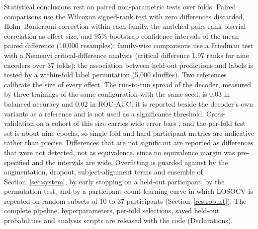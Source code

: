Statistical conclusions rest on paired non-parametric tests over folds. Paired comparisons use the Wilcoxon signed-rank test with zero differences discarded, Holm--Bonferroni correction within each family, the matched-pairs rank-biserial correlation as effect size, and 95\% bootstrap confidence intervals of the mean paired difference (10{,}000 resamples); family-wise comparisons use a Friedman test with a Nemenyi critical-difference analysis (critical difference 1.97 ranks for nine encoders over 37 folds); the association between held-out predictions and labels is tested by a within-fold label permutation (5{,}000 shuffles). Two references calibrate the size of every effect. The run-to-run spread of the decoder, measured by three trainings of the same configuration with the same seed, is 0.03 in balanced accuracy and 0.02 in ROC-AUC; it is reported beside the decoder's own variants as a reference and is not used as a significance threshold. Cross-validation on a cohort of this size carries wide error bars \cite{ref63}, and the per-fold test set is about nine epochs, so single-fold and hard-participant metrics are indicative rather than precise. Differences that are not significant are reported as differences that were not detected, not as equivalence, since no equivalence margin was pre-specified and the intervals are wide. Overfitting is guarded against by the augmentation, dropout, subject-alignment terms and ensemble of Section~\ref{sec:system}, by early stopping on a held-out participant, by the permutation test, and by a participant-count learning curve in which LOSOCV is repeated on random subsets of 10 to 37 participants (Section~\ref{res:robust}). The complete pipeline, hyperparameters, per-fold selections, saved held-out probabilities and analysis scripts are released with the code (Declarations).
